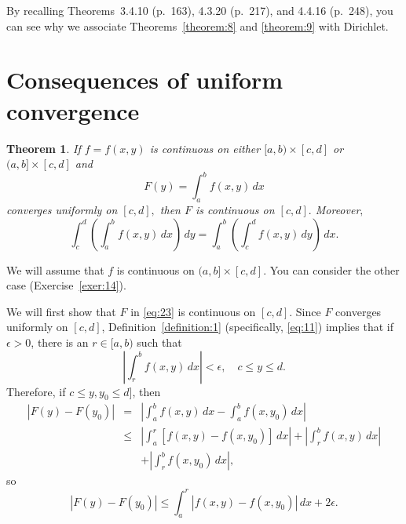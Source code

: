 \documentclass{article}
\newtheorem{theorem}{Theorem}
\newcommand{\proof}{\noindent{\sc\bf Proof}\quad }
\begin{document}
By recalling Theorems~3.4.10 (p.~163), 4.3.20 (p.~217), and 4.4.16
(p.~248), you can see why   we associate  Theorems~\ref{theorem:8}  and
\ref{theorem:9}
 with Dirichlet.

\section{Consequences of uniform convergence}\label{section:consequences}

\begin{theorem}  \label{theorem:10}
If  $f=f(x,y)$ is continuous on either  $[a,b)\times [c,d]$ or
$(a,b]\times [c,d]$ and
\begin{equation} \label{eq:23}
F(y)=\int_{a}^{b}f(x,y)\,dx
\end{equation}
converges uniformly on $[c,d],$  then $F$ is continuous on
$[c,d].$ Moreover$,$
\begin{equation} \label{eq:24}
\int_{c}^{d}\left(\int_{a}^{b}f(x,y)\,dx\right)\,dy
=\int_{a}^{b}\left(\int_{c}^{d}f(x,y)\,dy\right)\,dx.
\end{equation}
\end{theorem}


\proof  We will assume that $f$ is continuous on $(a,b]\times [c,d]$.
You can consider the other case (Exercise~\ref{exer:14}).


We will first show that $F$ in \eqref{eq:23} is continuous on $[c,d]$.
Since $F$  converges uniformly on $[c,d]$,
Definition~\ref{definition:1}
(specifically, \eqref{eq:11})
   implies that  if $\epsilon>0$, there is an
$r \in [a,b)$ such that
$$
\left|\int_{r}^{b}f(x,y)\,dx\right|< \epsilon, \quad c \le y \le d.
$$
Therefore, if $c\le y, y_{0}\le d]$, then
\begin{eqnarray*}
|F(y)-F(y_{0})|&=&
\left|\int_{a}^{b}f(x,y)\,dx-\int_{a}^{b}f(x,y_{0})\,dx\right|\\
&\le&\left|\int_{a}^{r}[f(x,y)-f(x,y_{0})]\,dx\right|+
\left|\int_{r}^{b}f(x,y)\,dx\right|\\
&&+\left|\int_{r}^{b}f(x,y_{0})\,dx\right|,
\end{eqnarray*}
so
\begin{equation}\label{eq:25}
|F(y)-F(y_{0})|
\le  \int_{a}^{r}|f(x,y)-f(x,y_{0})|\,dx +2\epsilon.
\end{equation}
\end{document}
